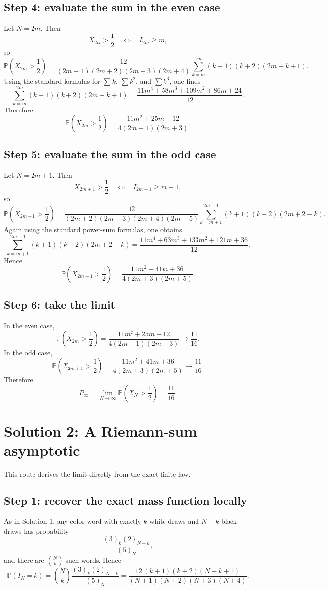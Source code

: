 \documentclass[12pt]{article}
\begin{document}
\subsection*{Step 4: evaluate the sum in the even case}
Let $N=2m$. Then
\[
X_{2m}>\frac12
\quad\Longleftrightarrow\quad
I_{2m}\ge m,
\]
so
\[
\mathbb{P}\!\left(X_{2m}>\frac12\right)
=
\frac{12}{(2m+1)(2m+2)(2m+3)(2m+4)}
\sum_{k=m}^{2m}(k+1)(k+2)(2m-k+1).
\]
Using the standard formulas for $\sum k$, $\sum k^2$, and $\sum k^3$, one finds
\[
\sum_{k=m}^{2m}(k+1)(k+2)(2m-k+1)
=
\frac{11m^4+58m^3+109m^2+86m+24}{12}.
\]
Therefore
\[
\mathbb{P}\!\left(X_{2m}>\frac12\right)
=
\frac{11m^2+25m+12}{4(2m+1)(2m+3)}.
\]

\subsection*{Step 5: evaluate the sum in the odd case}
Let $N=2m+1$. Then
\[
X_{2m+1}>\frac12
\quad\Longleftrightarrow\quad
I_{2m+1}\ge m+1,
\]
so
\[
\mathbb{P}\!\left(X_{2m+1}>\frac12\right)
=
\frac{12}{(2m+2)(2m+3)(2m+4)(2m+5)}
\sum_{k=m+1}^{2m+1}(k+1)(k+2)(2m+2-k).
\]
Again using the standard power-sum formulas, one obtains
\[
\sum_{k=m+1}^{2m+1}(k+1)(k+2)(2m+2-k)
=
\frac{11m^4+63m^3+133m^2+121m+36}{12}.
\]
Hence
\[
\mathbb{P}\!\left(X_{2m+1}>\frac12\right)
=
\frac{11m^2+41m+36}{4(2m+3)(2m+5)}.
\]

\subsection*{Step 6: take the limit}
In the even case,
\[
\mathbb{P}\!\left(X_{2m}>\frac12\right)
=
\frac{11m^2+25m+12}{4(2m+1)(2m+3)}
\longrightarrow
\frac{11}{16}.
\]
In the odd case,
\[
\mathbb{P}\!\left(X_{2m+1}>\frac12\right)
=
\frac{11m^2+41m+36}{4(2m+3)(2m+5)}
\longrightarrow
\frac{11}{16}.
\]
Therefore
\[
P_\infty=\lim_{N\to\infty}\mathbb{P}\!\left(X_N>\frac12\right)=\frac{11}{16}.
\]

\section{Solution 2: A Riemann-sum asymptotic}

This route derives the limit directly from the exact finite law.

\subsection*{Step 1: recover the exact mass function locally}
As in Solution 1, any color word with exactly $k$ white draws and $N-k$ black draws has probability
\[
\frac{(3)_k(2)_{N-k}}{(5)_N},
\]
and there are $\binom{N}{k}$ such words. Hence
\[
\mathbb{P}(I_N=k)
=
\binom{N}{k}\frac{(3)_k(2)_{N-k}}{(5)_N}
=
\frac{12\,(k+1)(k+2)(N-k+1)}{(N+1)(N+2)(N+3)(N+4)}.
\]
\end{document}
